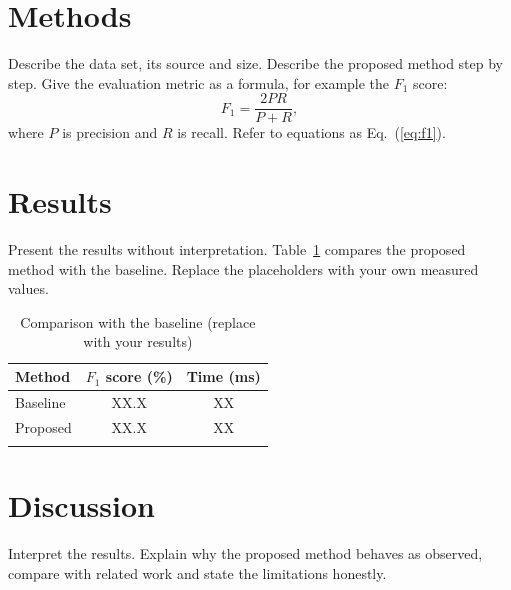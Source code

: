 \documentclass[sn-mathphys-num]{sn-jnl}
\begin{document}
\section{Methods}\label{sec2}
Describe the data set, its source and size. Describe the proposed method step by step. Give the evaluation metric as a formula, for example the $F_1$ score:
\begin{equation}
  F_1 = \frac{2PR}{P+R},
  \label{eq:f1}
\end{equation}
where $P$ is precision and $R$ is recall. Refer to equations as Eq.~(\ref{eq:f1}).

\section{Results}\label{sec3}
Present the results without interpretation. Table~\ref{tab:results} compares the proposed method with the baseline. Replace the placeholders with your own measured values.

\begin{table}[h]
  \caption{Comparison with the baseline (replace with your results)}
  \label{tab:results}
  \begin{tabular}{@{}lcc@{}}
    \toprule
    Method & $F_1$ score (\%) & Time (ms) \\
    \midrule
    Baseline & XX.X & XX \\
    Proposed & XX.X & XX \\
    \botrule
  \end{tabular}
\end{table}


\section{Discussion}\label{sec4}
Interpret the results. Explain why the proposed method behaves as observed, compare with related work \cite{vaswani2017attention} and state the limitations honestly.
\end{document}
